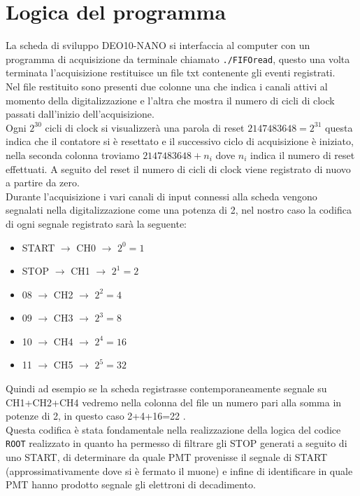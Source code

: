 \documentclass[10pt,a4paper]{article}
\begin{document}
\section{Logica del programma}
\label{app:logica_prog_1}
\begin{flushleft}
La scheda di sviluppo DEO10-NANO si interfaccia al computer con un programma di acquisizione da terminale chiamato \texttt{./FIFOread}, questo una volta terminata l'acquisizione restituisce un file txt contenente gli eventi registrati.\\ Nel file restituito sono presenti due colonne una che indica i canali attivi al momento della digitalizzazione e l'altra che mostra il numero di cicli di clock passati dall'inizio dell'acquisizione.\\ Ogni $2^{30}$ cicli di clock si visualizzerà una parola di reset $2147483648=2^{31}$ questa indica che il contatore si è resettato e il successivo ciclo di acquisizione è iniziato, nella seconda colonna troviamo $2147483648 +n_i$ dove $n_i$ indica il numero di reset effettuati. A seguito del reset il numero di cicli di clock viene registrato di nuovo a partire da zero.\\
Durante l'acquisizione i vari canali di input connessi alla scheda vengono segnalati nella digitalizzazione come una potenza di 2, nel nostro caso la codifica di ogni segnale registrato sarà la seguente:
\begin{itemize}
    \item START $\rightarrow$ CH0 $\rightarrow$ $2^0=1$
    \item STOP $\rightarrow$ CH1 $\rightarrow$ $2^1=2$
    \item 08 $\rightarrow$ CH2 $\rightarrow$ $2^2=4$
    \item 09 $\rightarrow$ CH3 $\rightarrow$ $2^3=8$
    \item 10 $\rightarrow$ CH4 $\rightarrow$ $2^4=16$
    \item 11 $\rightarrow$ CH5 $\rightarrow$ $2^5=32$
\end{itemize}
Quindi ad esempio se la scheda registrasse contemporaneamente segnale su CH1+CH2+CH4 vedremo nella colonna del file un numero pari alla somma in potenze di 2, in questo caso 2+4+16=22 .\\
Questa codifica è stata fondamentale nella realizzazione della logica del codice \texttt{ROOT} realizzato in quanto ha permesso di filtrare gli STOP generati a seguito di uno START, di determinare da quale PMT provenisse il segnale di START (approssimativamente dove si è fermato il muone) e infine di identificare in quale PMT hanno prodotto segnale gli elettroni di decadimento.\\

\end{flushleft}
\end{document}

